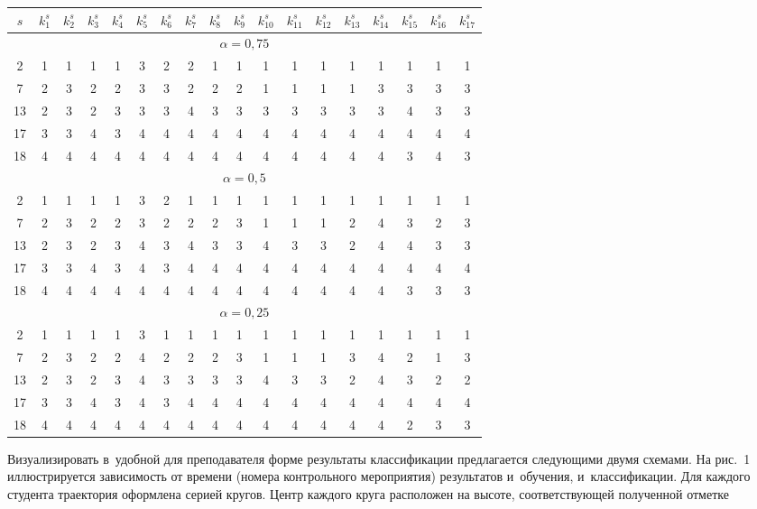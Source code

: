 \begin{multicols}{2}
\begin{table*}[b]
\begin{center}
      \begin{tabular}{|c|c|c|c|c|c|c|c|c|c|c|c|c|c|c|c|c|c|}
      \hline
    $s$&$k_1^s$&$k_2^s$&$k_3^s$&$k_4^s$&$k_5^s$&$k_6^s$&$k_7^s$&$k_8^s$&$k_9^s$&$k^s_{10}
$&$k^s_{11}$&$k^s_{12}$&$k^s_{13}$&$k^s_{14}$&$k^s_{15}$&$k^s_{16}$&$k_{17}^s$\\
      \hline
  \multicolumn{18}{|c|}{$\alpha=0{,}75$}\\
\hline
\hphantom{9}2&1&1&1&1&3&2&2&1&1&1&1&1&1&1&1&1&1\\
\hphantom{9}7&2&3&2&2&3&3&2&2&2&1&1&1&1&3&3&3&3\\
13&2&3&2&3&3&3&4&3&3&3&3&3&3&3&4&3&3\\
17&3&3&4&3&4&4&4&4&4&4&4&4&4&4&4&4&4\\
18&4&4&4&4&4&4&4&4&4&4&4&4&4&4&3&4&3\\
\hline
      \multicolumn{18}{|c|}{$\alpha=0{,}5$}\\
     \hline
\hphantom{9}2&1&1&1&1&3&2&1&1&1&1&1&1&1&1&1&1&1\\
\hphantom{9}7&2&3&2&2&3&2&2&2&3&1&1&1&2&4&3&2&3\\
13&2&3&2&3&4&3&4&3&3&4&3&3&2&4&4&3&3\\
17&3&3&4&3&4&3&4&4&4&4&4&4&4&4&4&4&4\\
18&4&4&4&4&4&4&4&4&4&4&4&4&4&4&3&3&3\\
\hline
      \multicolumn{18}{|c|}{$\alpha=0{,}25$}\\
      \hline
\hphantom{9}2&1&1&1&1&3&1&1&1&1&1&1&1&1&1&1&1&1\\
\hphantom{9}7&2&3&2&2&4&2&2&2&3&1&1&1&3&4&2&1&3\\
13&2&3&2&3&4&3&3&3&3&4&3&3&2&4&3&2&2\\
17&3&3&4&3&4&3&4&4&4&4&4&4&4&4&4&4&4\\
18&4&4&4&4&4&4&4&4&4&4&4&4&4&4&2&3&3\\
\hline
\end{tabular}
\end{center}
\end{table*}


     
     Визуализировать в~удобной для преподавателя форме результаты 
классификации предлагается следующими двумя схемами. На рис.~1 
иллюстрируется зависимость от времени (номера контрольного мероприятия) 
результатов и~обучения, и~классификации. Для каждого студента траектория 
оформлена серией кругов. Центр каждого круга расположен
 на высоте, 
соответствующей полученной отметке\linebreak\vspace*{-12pt}


\end{multicols}
